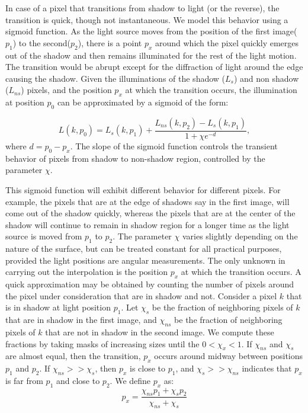 In case of a pixel that transitions from shadow to light (or the reverse), the
transition is quick, though not instantaneous. We model this behavior using a
sigmoid function. As the light source moves from the position of the first
image($p_1$) to  the second($p_2$), there is a point $p_x$ around which the
pixel quickly emerges out of the shadow and then remains illuminated for the
rest of the light motion. The transition would be abrupt except for the
diffraction of light around the edge causing the shadow. Given the illuminations
of the shadow ($L_s$) and non shadow ($L_{ns}$) pixels, and the position $p_x$
at which the transition occurs, the illumination at position $p_0$ can be
approximated by a sigmoid of the form:


\begin{equation}
L(k,p_0) = L_{s}(k,p_1) + \frac{L_{ns}(k,p_2) - L_{s}(k,p_1)}{1 + \chi e^{-d}},
\end{equation}
where $d = p_0 - p_x$. The slope of the sigmoid function controls the transient
behavior of pixels from shadow to non-shadow region, controlled by the parameter
$\chi$.

This sigmoid function will exhibit different behavior for different pixels. For
example, the pixels that are at the edge of shadows say in the first image, will
come out of the shadow quickly, whereas the pixels that are at the center of the
shadow will continue to remain in shadow region for a longer time as the light
source is moved from $p_1$ to $p_2$. The parameter $\chi$ varies slightly depending
on the nature of the surface, but can be treated constant for all practical
purposes, provided the light positions are angular measurements. The only
unknown in carrying out the interpolation is the position $p_x$ at which the
transition occurs. 
A quick approximation
may be obtained by counting the number of pixels around the pixel under
consideration that are in shadow and not.
Consider a pixel $k$ that is in shadow at light position $p_1$. Let $\chi_s$ be the
fraction of neighboring pixels of $k$ that are in shadow in the first image, and
$\chi_{ns}$ be the fraction of neighboring pixels of $k$ that are not in shadow in
the second image. We compute these fractions by taking masks of increasing sizes
until the $0 < \chi_x < 1$. If $\chi_{ns}$ and $\chi_{s}$ are almost equal, then the
transition, $p_x$ occurs around midway between positions $p_1$ and $p_2$. If
$\chi_{ns} >> \chi_{s}$, then $p_x$ is close to $p_1$, and $\chi_{s} >> \chi_{ns}$ indicates
that $p_x$ is far from $p_1$ and close to $p_2$. We define $p_x$ as: 
\begin{equation}
p_x = \frac{\chi_{ns} p_1 + \chi_s p_2}{\chi_{ns} + \chi_s}
\end{equation}

